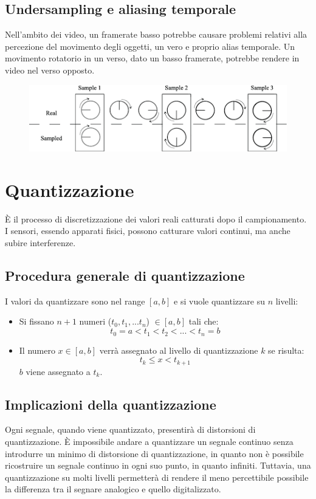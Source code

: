 \documentclass{report}
\begin{document}
	\subsection{Undersampling e aliasing temporale}
	Nell'ambito dei video, un framerate basso potrebbe causare problemi relativi alla percezione del movimento degli oggetti, un vero e proprio alias temporale. Un movimento rotatorio in un verso, dato un basso framerate, potrebbe rendere in video nel verso opposto.
	\begin{figure}[htp]
		\centering
		\includegraphics[width=1\linewidth]{wheel.png}
	\end{figure}
	\section{Quantizzazione}
	È il processo di discretizzazione dei valori reali catturati dopo il campionamento. \\
	I sensori, essendo apparati fisici, possono catturare valori continui, ma anche subire interferenze.
	
	\subsection{Procedura generale di quantizzazione}
	I valori da quantizzare sono nel range $[a,b]$ e si vuole quantizzare su $n$ livelli:
	\begin{itemize}
		\item Si fissano $n+1$ numeri ($t_0,t_1,...t_n$) $\in [a,b]$ tali che:
		      $$
		      t_0 = a < t_1 < t_2 < ... < t_n = b
		      $$
		\item Il numero $x \in [a,b]$ verrà assegnato al livello di quantizzazione $k$ se risulta:
		      $$
		      t_k \leq x < t_{k+1}
		      $$
		      $b$ viene assegnato a $t_k$.
	\end{itemize}
	\subsection{Implicazioni della quantizzazione}
	
	Ogni segnale, quando viene quantizzato, presentirà di distorsioni di quantizzazione. È impossibile andare a quantizzare un segnale continuo senza introdurre un minimo di distorsione di quantizzazione, in quanto non è possibile ricostruire un segnale continuo in ogni suo punto, in quanto infiniti. Tuttavia, una quantizzazione su molti livelli permetterà di rendere il meno percettibile possibile la differenza tra il segnare analogico e quello digitalizzato.
	
\end{document}

